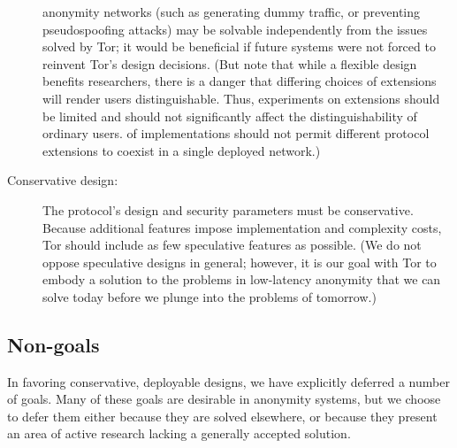 \documentclass[times,10pt,twocolumn]{article}
\begin{document}
\begin{description}
  anonymity networks (such as generating dummy traffic, or preventing
  pseudospoofing attacks) may be solvable independently from the issues
  solved by Tor; it would be beneficial if future systems were not forced to
  reinvent Tor's design decisions.  (But note that while a flexible design
  benefits researchers, there is a danger that differing choices of
  extensions will render users distinguishable.  Thus, experiments
  on extensions should be limited and should not significantly affect
  the distinguishability of ordinary users.
  of implementations should
  not permit different protocol extensions to coexist in a single deployed
  network.)
\item[Conservative design:] The protocol's design and security parameters
  must be conservative.  Because additional features impose implementation
  and complexity costs, Tor should include as few speculative features as
  possible.  (We do not oppose speculative designs in general; however, it is
  our goal with Tor to embody a solution to the problems in low-latency
  anonymity that we can solve today before we plunge into the problems of
  tomorrow.)
\end{description}

\subsection{Non-goals}
In favoring conservative, deployable designs, we have explicitly deferred
a number of goals. Many of these goals are desirable in anonymity systems,
but we choose to defer them either because they are solved elsewhere,
or because they present an area of active research lacking a generally
accepted solution.
\end{document}
